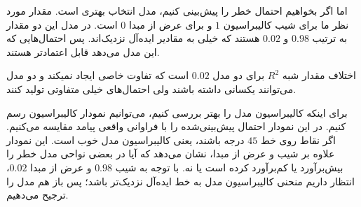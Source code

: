 \documentclass[12pt, answers]{exam}
\renewenvironment{solution}{%
  \par
  \begin{tcolorbox}[
    breakable,                
    colback=white,
    colframe=black,
    arc=1pt,
    boxrule=0.6pt,
    left=4mm, right=4mm,
    top=2mm, bottom=2mm,
    before skip=10pt,
    after skip=10pt,
    segmentation style={solid, black}, 
    before upper={\noindent\textbf{\color{blue}پاسخ:}\par\vspace{0.5em}}
  ]
 }
{%
  \end{tcolorbox}
  \vspace{1em}
}
\begin{document}
\begin{questions}
\begin{solution}
        اما اگر بخواهیم احتمال خطر را پیش‌بینی کنیم، مدل  انتخاب بهتری است. مقدار مورد نظر ما برای شیب کالیبراسیون $1$ و برای عرض از مبدا $0$ است. در مدل  این دو مقدار به ترتیب $0.98$ و $0.02$ هستند که خیلی به مقادیر ایده‌آل نزدیک‌اند. پس احتمال‌هایی که این مدل می‌دهد قابل اعتمادتر هستند.

        اختلاف مقدار شبه $R^2$ برای دو مدل $0.02$ است که تفاوت خاصی ایجاد نمیکند
        و دو مدل می‌توانند  یکسانی داشته باشند ولی احتمال‌های خیلی متفاوتی تولید کنند.

        برای اینکه کالیبراسیون مدل را بهتر بررسی کنیم، می‌توانیم نمودار کالیبراسیون رسم کنیم. در این نمودار احتمال پیش‌بینی‌شده را با فراوانی واقعی پیامد مقایسه می‌کنیم. اگر نقاط روی خط $45$ درجه باشند، یعنی کالیبراسیون مدل خوب است. این نمودار علاوه بر شیب و عرض از مبدا، نشان می‌دهد که آیا در بعضی نواحی مدل خطر را بیش‌برآورد یا کم‌برآورد کرده است یا نه. با توجه به شیب $0.98$ و عرض از مبدا $0.02$، انتظار داریم منحنی کالیبراسیون مدل  به خط ایده‌آل نزدیک‌تر باشد؛ پس باز هم مدل  را ترجیح می‌دهیم.
    \end{solution}

\end{questions}
\end{document}
